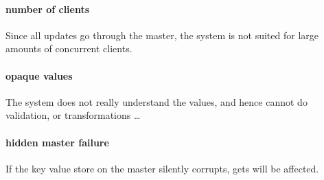 \paragraph{number of clients}
Since all updates go through the master, the system is not suited for large amounts of concurrent clients.
\paragraph{opaque values}
The system does not really understand the values, and hence cannot do validation, or transformations \ldots
\paragraph{hidden master failure}
If the key value store on the master silently corrupts, gets will be affected.

